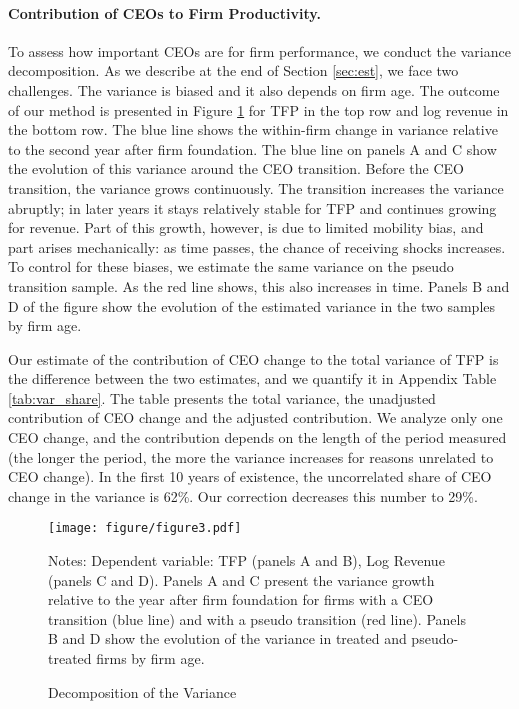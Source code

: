 \documentclass[11pt,a4paper]{article}
\begin{document}
\paragraph{Contribution of CEOs to Firm Productivity.} To assess how important CEOs are for firm performance, we conduct the variance decomposition. As we describe at the end of Section \ref{sec:est}, we face two challenges. The variance is biased and it also depends on firm age. The outcome of our method is presented in Figure \ref{fig:variance_decomp} for TFP in the top row and log revenue in the bottom row. The blue line shows the within-firm change in variance relative to the second year after firm foundation. The blue line on panels A and C show the evolution of this variance around the CEO transition. Before the CEO transition, the variance grows continuously. The transition increases the variance abruptly; in later years it stays relatively stable for TFP and continues growing for revenue. Part of this growth, however, is due to limited mobility bias, and part arises mechanically: as time passes, the chance of receiving shocks increases. To control for these biases, we estimate the same variance on the pseudo transition sample. As the red line shows, this also increases in time. Panels B and D of the figure show the evolution of the estimated variance in the two samples by firm age. 

Our estimate of the contribution of CEO change to the total variance of TFP is the difference between the two estimates, and we quantify it in Appendix Table \ref{tab:var_share}. The table presents the total variance, the unadjusted contribution of CEO change and the adjusted contribution. We analyze only one CEO change, and the contribution depends on the length of the period measured (the longer the period, the more the variance increases for reasons unrelated to CEO change). In the first 10 years of existence, the uncorrelated share of CEO change in the variance is 62\%. Our correction decreases this number to 29\%.


\begin{figure}[htbp]
\centering
\texttt{[image: figure/figure3.pdf]}
\label{fig:variance_decomp}
\begin{minipage}{15cm}
\caption{Decomposition of the Variance}
\vspace{.2cm}
\footnotesize Notes: Dependent variable: TFP (panels A and B), Log Revenue (panels C and D). Panels A and C present the variance growth relative to the year after firm foundation for firms with a CEO transition (blue line) and with a pseudo transition (red line). Panels B and D show the evolution of the variance in treated and pseudo-treated firms by firm age. 
\end{minipage}
\end{figure}
\end{document}
